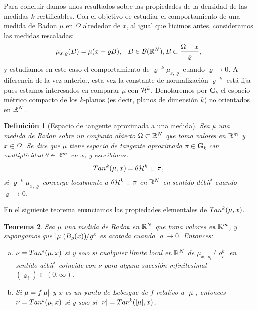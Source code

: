 \documentclass[a4paper,11pt,spanish, twoside, leqno]{tfm-uam}
\newtheorem{teo}{Teorema}[chapter]
\newtheorem{defi}[teo]{Definición}
\begin{document}
Para concluir damos unos resultados sobre las propiedades de la densidad de las medidas $k$-rectificables. Con el objetivo de estudiar el comportamiento de una medida de Radon $\mu$ en $\Omega$ alrededor de $x$, al igual que hicimos antes, consideramos las medidas rescaladas:
\begin{align*}
\begin{array}{ll}
\mu_{x,\varrho}(B)=\mu(x+\varrho B),& B\in \mathcal{B}(\mathbb{R}^{N}), B\subset\dfrac{\Omega -x}{\varrho},
\end{array}
\end{align*}
y estudiamos en este caso el comportamiento de $\varrho^{-k}\mu_{x,\varrho}$ cuando $\varrho\to 0$. A diferencia de la vez anterior, esta vez la constante de normalización $\varrho^{-k}$ está fija pues estamos interesados en comparar $\mu$ con $\mathcal{H}^{k}$. Denotaremos por $\mathbf{G}_{k}$ el espacio métrico compacto de los $k$-planos (es decir, planos de dimensión $k$) no orientados en $\mathbb{R}^{N}$.
\begin{defi}[Espacio de tangente aproximada a una medida]\label{defi:espacio de tangente aproximada a una medida} 
Sea $\mu$ una medida de Radon sobre un conjunto abierto $\Omega\subset\mathbb{R}^{N}$ que toma valores en $\mathbb{R}^{m}$ y $x\in \Omega$. Se dice que $\mu$ tiene espacio de tangente aproximada $\pi\in \mathbf{G}_{k}$ con multiplicidad $\theta\in\mathbb{R}^{m}$ en $x$, y escribimos:
\begin{align*}
\Tan{k}{\mu}{x}=\theta \Hm{k}\Radot \pi,
\end{align*}
si $\varrho^{-k}\mu_{x,\varrho}$ converge localmente a $\theta \Hm{k}\Radot \pi$ en $\mathbb{R}^{N}$ en sentido débil$^{*}$ cuando $\varrho\to 0$.
\end{defi}
En el siguiente teorema enunciamos las propiedades elementales de $\Tan{k}{\mu}{x}$.
\begin{teo}\label{teo:propiedades del espacio tangente aproximado a una medida}
Sea $\mu$ una medida de Radon en $\mathbb{R}^{N}$ que toma valores en $\mathbb{R}^{m}$, y supongamos que $\lvert\mu\rvert(B_{\varrho}(x))/\varrho^{k}$ es acotada cuando $\varrho\to 0$. Entonces:
\begin{enumerate}[(a)]
\item $\nu=\Tan{k}{\mu}{x}$ si y solo si cualquier límite local en $\mathbb{R}^{N}$ de $\mu_{x,\varrho_{i}}/\varrho_{i}^{k}$ en sentido débil$^{*}$ coincide con $\nu$ para alguna sucesión infinitesimal $(\varrho_{i})\subset (0,\infty)$.\label{teo:propiedades del espacio tangente aproximado a una medida:a}
\item Si $\mu=f\lvert\mu\rvert$ y $x$ es un punto de Lebesgue de $f$ relativo a $\lvert\mu\rvert$, entonces $\nu=\Tan{k}{\mu}{x}$ si y solo si $\abs{\nu}=\Tan{k}{\abs{\mu}}{x}$.\label{teo:propiedades del espacio tangente aproximado a una medida:b}
\end{enumerate} 
\end{teo}
\end{document}
